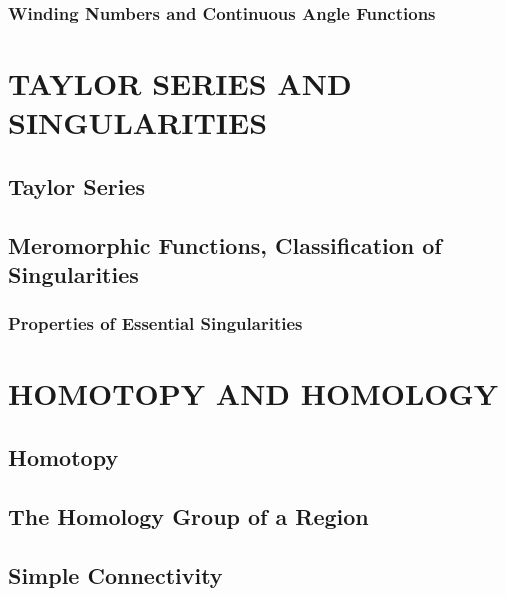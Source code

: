 \documentclass{refbook}
\begin{document}
  \subsubsection{Winding Numbers and Continuous Angle Functions}

  \section{TAYLOR SERIES AND SINGULARITIES}
  \subsection{Taylor Series}
  \subsection{Meromorphic Functions, Classification of Singularities}
  \subsubsection{Properties of Essential Singularities}

  \section{HOMOTOPY AND HOMOLOGY}
  \subsection{Homotopy}
  \subsection{The Homology Group of a Region}
  \subsection{Simple Connectivity}

  \section{}
\end{document}
